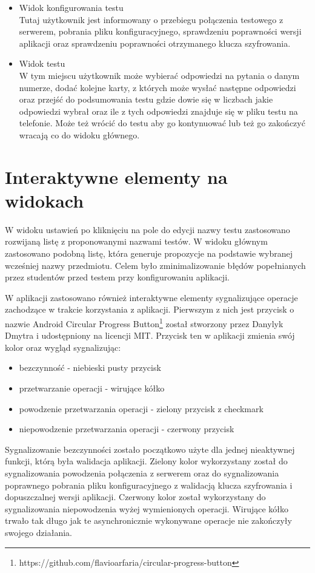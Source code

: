 \documentclass{report}
\begin{document}
\begin{itemize}
			\item Widok konfigurowania testu\\
			Tutaj użytkownik jest informowany o przebiegu połączenia testowego z serwerem, pobrania pliku konfiguracyjnego, sprawdzeniu poprawności wersji aplikacji oraz sprawdzeniu poprawności otrzymanego klucza szyfrowania.
			
			\item Widok testu\\
			W tym miejscu użytkownik może wybierać odpowiedzi na pytania o danym numerze, dodać kolejne karty, z których może wysłać następne odpowiedzi oraz przejść do podsumowania testu gdzie dowie się w liczbach jakie odpowiedzi wybrał oraz ile z tych odpowiedzi znajduje się w pliku testu na telefonie. Może też wrócić do testu aby go kontynuować lub też go zakończyć wracają co do widoku głównego.
			
		\end{itemize}
		
		\section{Interaktywne elementy na widokach}
		
		W widoku ustawień po kliknięciu na pole do edycji  nazwy testu zastosowano rozwijaną listę z proponowanymi nazwami testów.	W widoku głównym zastosowano podobną listę, która generuje propozycje na podstawie wybranej wcześniej nazwy przedmiotu. Celem było zminimalizowanie błędów popełnianych przez studentów przed testem przy konfigurowaniu aplikacji.
		
		W aplikacji zastosowano również interaktywne elementy sygnalizujące operacje zachodzące w trakcie korzystania z aplikacji.
		Pierwszym z nich jest przycisk o nazwie Android Circular Progress Button\footnote{https://github.com/flavioarfaria/circular-progress-button} został stworzony przez Danylyk Dmytra i udostępniony na licencji MIT. Przycisk ten w aplikacji zmienia swój kolor oraz wygląd sygnalizując:
		\begin{itemize}
			\item bezczynność - niebieski pusty przycisk
			\item przetwarzanie operacji - wirujące kółko
			\item powodzenie przetwarzania operacji - zielony przycisk z checkmark
			\item niepowodzenie przetwarzania operacji - czerwony przycisk 
		\end{itemize}
		Sygnalizowanie bezczynności zostało początkowo użyte dla jednej nieaktywnej funkcji, którą była walidacja aplikacji. Zielony kolor wykorzystany został do sygnalizowania powodzenia połączenia z serwerem oraz do sygnalizowania poprawnego pobrania pliku konfiguracyjnego z walidacją klucza szyfrowania i dopuszczalnej wersji aplikacji.
		Czerwony kolor został wykorzystany do sygnalizowania niepowodzenia wyżej wymienionych operacji.
		Wirujące kółko trwało tak długo jak te asynchronicznie wykonywane operacje nie zakończyły swojego działania.\\
		
\end{document}
